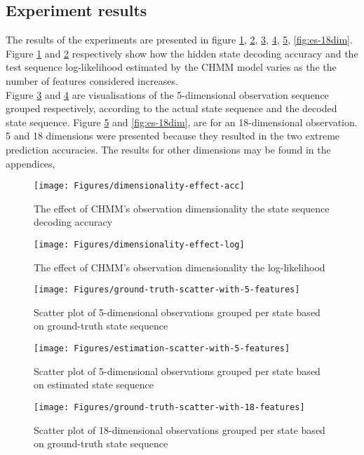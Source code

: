 \subsection{Experiment results}
The results of the experiments are presented in figure \ref{fig:dim-acc}, \ref{fig:dim-log}, \ref{fig:gt-5dim}, \ref{fig:es-5dim}, \ref{fig:gt-18dim}, \ref{fig:es-18dim}.\\
Figure \ref{fig:dim-acc} and \ref{fig:dim-log} respectively show how the hidden state decoding accuracy and the test sequence log-likelihood estimated by the CHMM model varies as the the number of features considered increases.\\
Figure \ref{fig:gt-5dim} and \ref{fig:es-5dim} are visualisations of the 5-dimensional observation sequence grouped respectively, according to the actual state sequence and the decoded state sequence. Figure \ref{fig:gt-18dim} and \ref{fig:es-18dim}, are for an 18-dimensional observation.
5 and 18 dimensions were presented because they resulted in the two extreme prediction accuracies. The results for other dimensions may be found in the appendices, %
\begin{figure}[ht!]
	\centering
	\texttt{[image: Figures/dimensionality-effect-acc]}
	\caption{The effect of CHMM's observation dimensionality the state sequence decoding accuracy}
	\label{fig:dim-acc}
\end{figure}

\begin{figure}[ht!]
	\texttt{[image: Figures/dimensionality-effect-log]}
	\caption{The effect of CHMM's observation dimensionality the log-likelihood}
	\label{fig:dim-log}
\end{figure}


\begin{figure}[ht!]
	\texttt{[image: Figures/ground-truth-scatter-with-5-features]}
	\caption{Scatter plot of  5-dimensional observations grouped per state based on ground-truth state sequence}
	\label{fig:gt-5dim}
\end{figure}
\begin{figure}[ht!]
	\texttt{[image: Figures/estimation-scatter-with-5-features]}
	\caption{Scatter plot of 5-dimensional observations grouped per state based on estimated state sequence}
	\label{fig:es-5dim}
\end{figure}

\begin{figure}[ht!]
	\texttt{[image: Figures/ground-truth-scatter-with-18-features]}
	\caption{Scatter plot of 18-dimensional observations grouped per state based on ground-truth state sequence}
	\label{fig:gt-18dim}
\end{figure}

